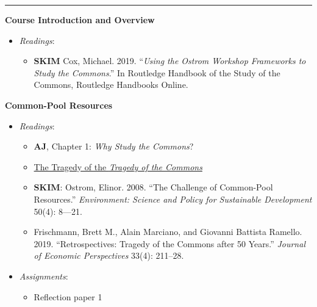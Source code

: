 \begin{center}\rule{0.5\linewidth}{0.5pt}\end{center}

\SetDate[16/08/2021]

\week \textbf{Course Introduction and Overview}

\begin{itemize}

\item
  \emph{Readings}:

  \begin{itemize}
  
  \item
    \textbf{SKIM} Cox, Michael. 2019. ``\emph{Using the Ostrom Workshop
    Frameworks to Study the Commons}.'' In Routledge Handbook of the
    Study of the Commons, Routledge Handbooks Online.
  \end{itemize}
\end{itemize}

\week \textbf{Common-Pool Resources}

\begin{itemize}

\item
  \emph{Readings}:

  \begin{itemize}
  
  \item
    \textbf{AJ}, Chapter 1: \emph{Why Study the Commons}?
  \item
    \href{https://blogs.scientificamerican.com/voices/the-tragedy-of-the-tragedy-of-the-commons/}{The
    Tragedy of the \emph{Tragedy of the Commons}}
  \item
    \textbf{SKIM}: Ostrom, Elinor. 2008. ``The Challenge of Common-Pool
    Resources.'' \emph{Environment: Science and Policy for Sustainable
    Development} 50(4): 8---21.
  \item
    Frischmann, Brett M., Alain Marciano, and Giovanni Battista Ramello.
    2019. ``Retrospectives: Tragedy of the Commons after 50 Years.''
    \emph{Journal of Economic Perspectives} 33(4): 211--28.
  \end{itemize}
\item
  \emph{Assignments}:

  \begin{itemize}
  
  \item
    Reflection paper 1
  \end{itemize}
\end{itemize}

